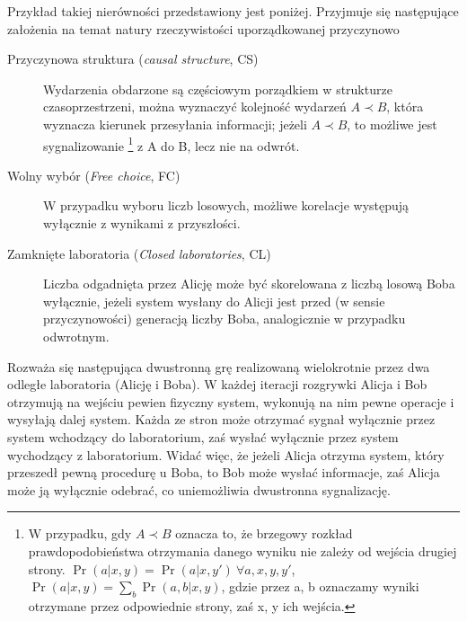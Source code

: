 \documentclass[10pt]{article} %
\begin{document}
Przykład takiej nierówności przedstawiony jest poniżej.
Przyjmuje się następujące założenia na temat natury rzeczywistości uporządkowanej przyczynowo \cite{process_matrix}
\begin{description}
	\item[Przyczynowa struktura (\textit{causal structure}, CS)]
	Wydarzenia obdarzone są częściowym porządkiem w strukturze czasoprzestrzeni, można wyznaczyć kolejność wydarzeń $A \prec B$, która wyznacza kierunek przesyłania informacji; jeżeli $A \prec B$, to możliwe jest sygnalizowanie
	\footnote
	{W przypadku, gdy $A \prec B$ oznacza to, że brzegowy rozkład prawdopodobieństwa otrzymania danego wyniku nie zależy od wejścia drugiej strony. $\Pr(a|x, y) = \Pr(a|x, y')~\forall a,x,y,y'$, $\Pr(a|x,y) = \sum_b \Pr(a,b|x,y)$, gdzie przez a, b oznaczamy wyniki otrzymane przez odpowiednie strony, zaś x, y ich wejścia.} 
	z A do B, lecz nie na odwrót.
	\item[Wolny wybór (\textit{Free choice}, FC)]  
	W przypadku wyboru liczb losowych, możliwe korelacje występują wyłącznie z wynikami z przyszłości.
	\item[Zamknięte laboratoria (\textit{Closed laboratories}, CL)] 
	Liczba odgadnięta przez Alicję może być skorelowana z liczbą losową Boba wyłącznie, jeżeli system wysłany do Alicji jest przed (w sensie przyczynowości) generacją liczby Boba, analogicznie w przypadku odwrotnym.	
\end{description}
Rozważa się następująca dwustronną grę realizowaną wielokrotnie przez dwa odległe laboratoria (Alicję i Boba). W każdej iteracji rozgrywki Alicja i Bob otrzymują na wejściu pewien fizyczny system, wykonują na nim pewne operacje i wysyłają dalej system. Każda ze stron może otrzymać sygnał wyłącznie przez 
system wchodzący do laboratorium, zaś wysłać wyłącznie przez system wychodzący z laboratorium. Widać więc, że jeżeli Alicja otrzyma system, który przeszedł pewną procedurę u Boba, to Bob może wysłać informacje, zaś Alicja może ją wyłącznie odebrać, co uniemożliwia dwustronna sygnalizację.
\end{document}
